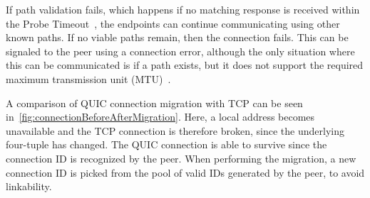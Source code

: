 If path validation fails, which happens if no matching response
is received within the Probe Timeout~\cite[sec. 6.2]{rfc9002},
the endpoints can continue communicating using other known paths.
If no viable paths remain, then the connection fails. This can be signaled to the peer 
using a  connection error, although the only
situation where this can be communicated is
if a path exists, but it does not support the required
maximum transmission unit (MTU)~\cite[sec.~8.2.4]{rfc9000}.

A comparison of QUIC connection migration with TCP can be seen in~\cref{fig:connectionBeforeAfterMigration}.
Here, a local address becomes unavailable and the TCP connection is therefore broken,
since the underlying four-tuple has changed. The
QUIC connection is able to survive since the connection
ID is recognized by the peer.
When performing the migration, a new connection ID is picked
from the pool of valid IDs generated by the peer, to
avoid linkability.

